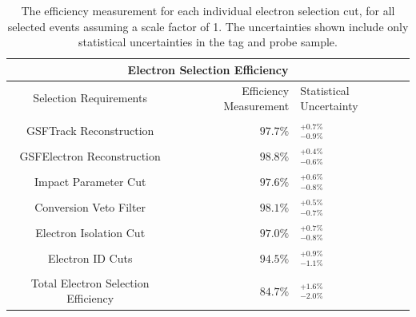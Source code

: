 \documentclass{cmspaper}
\begin{document}
\begin{table}[!ht]
\begin{center}
\begin{tabular}{|c|r|l|}
\hline
 \multicolumn{3}{|c|}{Electron Selection Efficiency} \\
\hline
 Selection Requirements & Efficiency Measurement & Statistical Uncertainty \\
\hline
\hline
 & & \\[1pt]
 GSFTrack Reconstruction             & $97.7\%$  & $^{+ 0.7\%}_{- 0.9\%}$  \\
 & & \\[1pt]
 GSFElectron Reconstruction          & $98.8\%$  & $^{+ 0.4\%}_{- 0.6\%}$  \\
 & & \\[1pt]
 Impact Parameter Cut                & $97.6\%$  & $^{+ 0.6\%}_{- 0.8\%}$  \\
 & & \\[1pt]
 Conversion Veto Filter              & $98.1\%$  & $^{+ 0.5\%}_{- 0.7\%}$  \\
 & & \\[1pt]
 Electron Isolation Cut              & $97.0\%$  & $^{+ 0.7\%}_{- 0.8\%}$  \\
 & & \\[1pt]
 Electron ID Cuts                    & $94.5\%$  & $^{+ 0.9\%}_{- 1.1\%}$  \\
 & & \\[1pt]
\hline                               
 Total Electron Selection Efficiency & $84.7\%$  & $^{+ 1.6\%}_{- 2.0\%}$  \\
\hline
\end{tabular}
\caption{The efficiency measurement for each individual electron selection cut, for all selected \Z\To\Ep\Em events assuming a scale factor of 1. The uncertainties shown include only statistical uncertainties in the tag and probe sample. \label{tab:electronEfficiencies1InvPb}}
\end{center}
\end{table}
\end{document}
